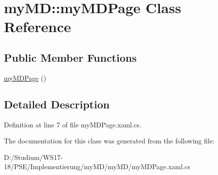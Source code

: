 \hypertarget{classmy_m_d_1_1my_m_d_page}{
\section{my\-MD::my\-MDPage Class Reference}
\label{d5/d8d/classmy_m_d_1_1my_m_d_page}
}
\subsection*{Public Member Functions}
\begin{CompactItemize}
\item 
\hypertarget{classmy_m_d_1_1my_m_d_page_ff3efcdf308c3ab0fb39df483f2def0c}{
\hyperlink{classmy_m_d_1_1my_m_d_page_ff3efcdf308c3ab0fb39df483f2def0c}{my\-MDPage} ()}
\label{d5/d8d/classmy_m_d_1_1my_m_d_page_ff3efcdf308c3ab0fb39df483f2def0c}

\end{CompactItemize}


\subsection{Detailed Description}




Definition at line 7 of file my\-MDPage.xaml.cs.

The documentation for this class was generated from the following file:\begin{CompactItemize}
\item 
D:/Studium/WS17-18/PSE/Implementierung/my\-MD/my\-MD/my\-MDPage.xaml.cs\end{CompactItemize}
